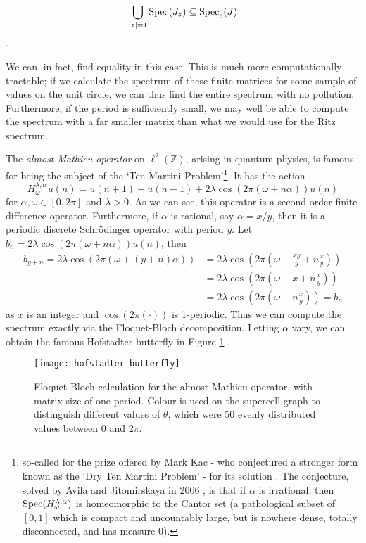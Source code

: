 \documentclass[../main.tex]{subfiles}
\begin{document}
$$\bigcup_{|z|=1} \mathrm{Spec}(J_z) \subseteq \mathrm{Spec}_e(J)$$.

We can, in fact, find equality in this case. This is much more computationally
tractable; if we calculate the spectrum of these finite matrices for some sample
of values on the unit circle, we can thus find the entire spectrum with no
pollution. Furthermore, if the period is sufficiently small, we may well be able
to compute the spectrum with a far smaller matrix than what we would use for the
Ritz spectrum.

\begin{example}
The \emph{almost Mathieu operator} on $\ell^2(\mathbb{Z})$, arising in quantum physics,
is famous for being the subject of the `Ten Martini Problem'\footnote{so-called
for the prize offered by Mark Kac - who conjectured a stronger form known as the
`Dry Ten Martini Problem' - for its solution \cite{simon1982almost}.
The conjecture, solved by Avila and Jitomirskaya in 2006 \cite{avila2006ten},
is that if $\alpha$ is irrational, then $\mathrm{Spec}(H_\omega^{\lambda, \alpha})$
is homeomorphic to the Cantor set (a pathological subset of $[0, 1]$ which is 
compact and uncountably large, but is nowhere dense, totally disconnected, and has measure 0).}.
It has the action
  $$H_\omega^{\lambda, \alpha} u(n) = u(n+1) + u(n-1) + 2\lambda \cos(2\pi (\omega + n \alpha))u(n)$$
for $\alpha, \omega \in [0, 2\pi]$ and $\lambda > 0$. As we can see, this
operator is a second-order finite difference operator. Furthermore, if
$\alpha$ is rational, say $\alpha = x/y$, then it is a periodic discrete
Schr\"odinger operator with period $y$.
Let $b_n = 2\lambda \cos(2\pi (\omega + n \alpha))u(n)$, then
\begin{align*} 
  b_{y+n} = 2\lambda \cos(2\pi (\omega + (y + n) \alpha)) 
	& = 2\lambda \cos(2\pi (\omega +  \frac{xy}{y} + n \frac{x}{y})) \\
  & = 2\lambda \cos(2\pi (\omega + x + n \frac{x}{y})) \\
  & = 2\lambda \cos(2\pi (\omega + n \frac{x}{y})) = b_n 
\end{align*}
  as $x$ is an integer and $\cos(2\pi(\cdot))$ is 1-periodic. Thus we can compute the
spectrum exactly via the Floquet-Bloch decomposition. Letting $\alpha$ vary, we can obtain
the famous Hofstadter butterfly in Figure \ref{fig:hofstadter-butterfly} \cite{hofstadter1976energy}.

\begin{figure}[p!] \centering
\texttt{[image: hofstadter-butterfly]}
\caption{Floquet-Bloch calculation for the almost Mathieu operator, with matrix
	size of one period. Colour is used on the supercell graph to
	distinguish different values of $\theta$, which were 50 evenly
	distributed values between $0$ and $2 \pi$.}
\label{fig:hofstadter-butterfly}
\end{figure}
\clearpage
\end{example}
\end{document}
